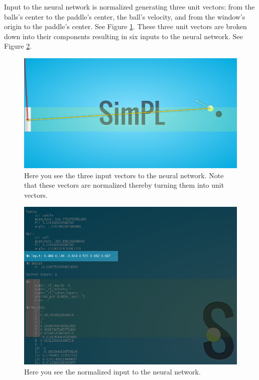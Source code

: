 \documentclass[a4paper,10pt]{article}
\begin{document}
Input to the neural network is normalized generating three unit vectors: from the balls's center to the paddle's center, the ball's velocity, and from the window's origin to the paddle's center. See Figure \ref{fig:unit_vectors}. These three unit vectors are broken down into their components resulting in six inputs to the neural network. See Figure \ref{fig:nn_input}. 

\begin{figure}[H]  
  \centering
  \includegraphics[width=1\textwidth]{figures/unit_vectors.png}
  \caption{Here you see the three input vectors to the neural network. Note that these vectors are normalized thereby turning them into unit vectors.}
  \label{fig:unit_vectors}
\end{figure}

\begin{figure}[H]  
  \centering
  \includegraphics[width=.9\textwidth]{figures/nn_input.png}
  \caption{Here you see the normalized input to the neural network.}
  \label{fig:nn_input}
\end{figure}
\end{document}
